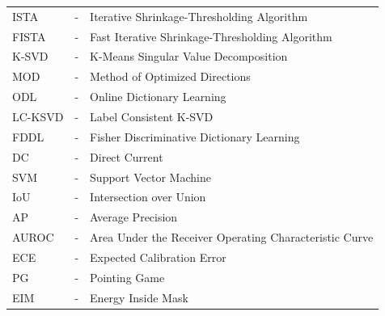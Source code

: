 \begin{tabular}{lcl}
ISTA & - & Iterative Shrinkage-Thresholding Algorithm\\
FISTA & - & Fast Iterative Shrinkage-Thresholding Algorithm\\
K-SVD & - & K-Means Singular Value Decomposition\\
MOD & - & Method of Optimized Directions\\
ODL & - & Online Dictionary Learning\\
LC-KSVD & - & Label Consistent K-SVD\\
FDDL & - & Fisher Discriminative Dictionary Learning\\
DC & - & Direct Current\\
SVM & - & Support Vector Machine\\
IoU & - & Intersection over Union\\
AP & - & Average Precision\\
AUROC & - & Area Under the Receiver Operating Characteristic Curve\\
ECE & - & Expected Calibration Error\\
PG & - & Pointing Game\\
EIM & - & Energy Inside Mask
\end{tabular}
